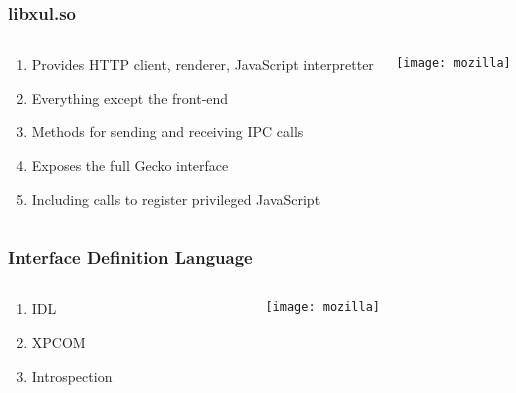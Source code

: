 \documentclass[
	notes=none,
	aspectratio=169
]{beamer}
\begin{document}
\begin{frame}
\frametitle{libxul.so}

\begin{columns}[T]
\begin{column}[T]{0.5\textwidth}
\setlength{\parskip}{0.5em}

\vspace{1.5cm}
\begin{enumerate}
\setlength{\parskip}{0.5em}
\item Provides HTTP client, renderer, JavaScript interpretter
\item Everything except the front-end
\item Methods for sending and receiving IPC calls
\item Exposes the full Gecko interface
\item Including calls to register privileged JavaScript
\end{enumerate}

\end{column}
\begin{column}[T]{0.5\textwidth}
\setlength{\parskip}{0.5em}

\vspace{0.5cm}
\texttt{[image: mozilla]}

\end{column}
\end{columns}

\end{frame}
\note{
\begin{enumerate}
\item -
\end{enumerate}
}


\begin{frame}
\frametitle{Interface Definition Language}

\begin{columns}[T]
\begin{column}[T]{0.5\textwidth}
\setlength{\parskip}{0.5em}

\vspace{1.5cm}
\begin{enumerate}
\setlength{\parskip}{0.5em}
\item IDL
\item XPCOM
\item Introspection
\end{enumerate}

\end{column}
\begin{column}[T]{0.5\textwidth}
\setlength{\parskip}{0.5em}

\vspace{0.5cm}
\texttt{[image: mozilla]}

\end{column}
\end{columns}

\end{frame}
\note{
\begin{enumerate}
\item -
\end{enumerate}
}
\end{document}
